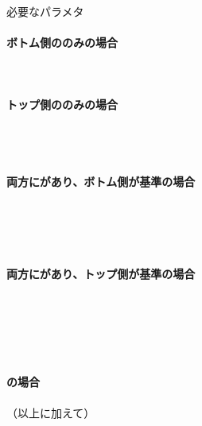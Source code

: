 \begin{Parameter}{必要なパラメタ}
\paragraph*{ボトム側の\Outcut のみの場合}
\PMBottomOutcutACwidth
\PMBottomOutcutBDwidth
\PMBottomOutcutConerR
\PMBottomOutcutLength\\
\PMBottomEndACID
\PMBottomOutcutAsideThickness
\PMPlatingThk
\tcbline*
\paragraph*{トップ側の\Outcut のみの場合}
\PMTopOutcutACwidth
\PMTopOutcutBDwidth
\PMTopOutcutCornerR\\
\PMTopOutcutLength
\PMKeywayPos
\PMKeywayWidth\\
\PMTopEndACID
\PMTopOutcutAsideThickness
\PMPlatingThk
\tcbline*
\paragraph*{両方に\Outcut があり、ボトム側が基準の場合}
\PMBottomOutcutACwidth
\PMBottomOutcutBDwidth
\PMBottomOutcutConerR
\PMBottomOutcutLength\\
\PMBottomEndACID
\PMBottomOutcutAsideThickness
\PMPlatingThk\\
\PMTopOutcutACwidth
\PMTopOutcutBDwidth
\PMTopOutcutCornerR
\PMTopOutcutLength\\
\PMKeywayPos
\PMKeywayWidth
\PMCenterlineEndFaceDifAC
\tcbline*
\paragraph*{両方に\Outcut があり、トップ側が基準の場合}
\PMTopOutcutACwidth
\PMTopOutcutBDwidth
\PMTopOutcutCornerR\\
\PMTopOutcutLength
\PMKeywayPos
\PMKeywayWidth\\
\PMTopEndACID
\PMTopOutcutAsideThickness
\PMPlatingThk\\
\PMBottomOutcutACwidth
\PMBottomOutcutBDwidth
\PMBottomOutcutConerR
\PMBottomOutcutLength\\
\PMCenterlineEndFaceDifAC
\tcbline*
\paragraph*{\CurvedOutcut の場合}
（以上に加えて）\PMCenterCurvatureRadius
\end{Parameter}

